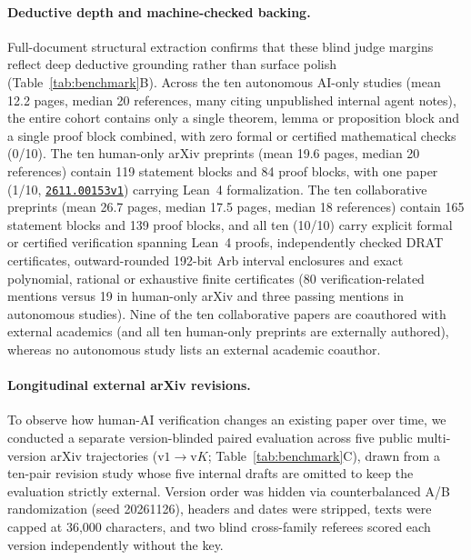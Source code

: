 \documentclass[11pt,a4paper]{article}
\newcommand{\arxiv}[1]{\href{https://arxiv.org/abs/#1}{\texttt{#1}}}
\begin{document}



\paragraph{Deductive depth and machine-checked backing.}
Full-document structural extraction confirms that these blind judge margins
reflect deep deductive grounding rather than surface polish
(Table~\ref{tab:benchmark}B). Across the ten autonomous AI-only studies (mean
12.2 pages, median 20 references, many citing unpublished internal agent
notes), the entire cohort contains only a single theorem, lemma or proposition
block and a single proof block combined, with zero formal or certified
mathematical checks (0/10). The ten human-only arXiv preprints (mean 19.6
pages, median 20 references) contain 119 statement blocks and 84 proof blocks,
with one paper (1/10, \arxiv{2611.00153v1}) carrying Lean~4 formalization.
The ten collaborative preprints (mean 26.7 pages, median 17.5 pages, median 18
references) contain 165 statement blocks and 139 proof blocks, and all ten
(10/10) carry explicit formal or certified verification spanning Lean~4 proofs,
independently checked DRAT certificates, outward-rounded 192-bit Arb interval
enclosures and exact polynomial, rational or exhaustive finite certificates
(80 verification-related mentions versus 19 in human-only arXiv and three
passing mentions in autonomous studies). Nine of the ten collaborative papers
are coauthored with external academics (and all ten human-only preprints are
externally authored), whereas no autonomous study lists an external academic
coauthor.

\paragraph{Longitudinal external arXiv revisions.}
To observe how human-AI verification changes an existing paper over time, we
conducted a separate version-blinded paired evaluation across five public
multi-version arXiv trajectories ($\text{v1}\to\text{v}K$;
Table~\ref{tab:benchmark}C), drawn from a ten-pair revision study whose five
internal drafts are omitted to keep the evaluation strictly external. Version
order was hidden via counterbalanced A/B randomization (seed 20261126), headers
and dates were stripped, texts were capped at 36,000 characters, and two blind
cross-family referees scored each version independently without the key.
\end{document}
